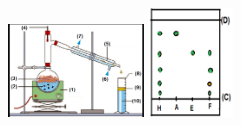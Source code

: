 \documentclass[12pt]{article}
\begin{document}
\begin{figure}
	\vspace{-1.4cm}
	\begin{center}
    \includegraphics[width=0.32\textwidth]{./img/hydro.png}
	\includegraphics[width=0.2\textwidth]{./img/CCM.png}
\end{center}
\end{figure}
\end{document}
